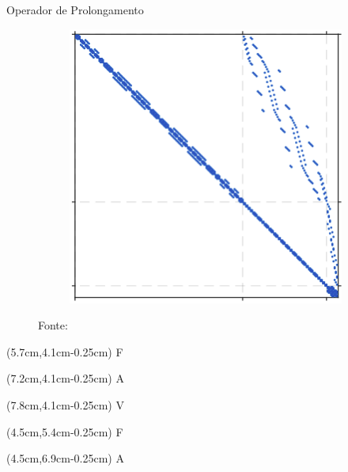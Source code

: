\documentclass[professionalfont]{beamer}
\begin{document}
\begin{frame}{Operador de Prolongamento}
\begin{figure}[!ht]
\begin{subfigure}{.3\textwidth}
            \subcaption{\finewirebasketMatrix}
            \label{fig:multiescala.4.b}
        \end{subfigure}
        \begin{subfigure}{.3\textwidth}
            \centering
            \includegraphics[scale=0.27]{./imgs/im12.png}
            \subcaption{$\finewirebasketMatrixMod$}
            \label{fig:multiescala.4.c}
        \end{subfigure}
        
        {\footnotesize Fonte:\cite{Magri2015}}
        \label{fig:multiescala.4}
    \end{figure}

    \newcommand{\deltaimg}{3.8cm}
    \newcommand{\deltaimgg}{3.65cm}
    \newcommand{\deltaimggg}{0.25cm}

    \begin{textblock*}{5cm}(5.7cm,4.1cm-\deltaimggg)
        F
    \end{textblock*}

    \begin{textblock*}{5cm}(7.2cm,4.1cm-\deltaimggg)
        A
    \end{textblock*}

    \begin{textblock*}{5cm}(7.8cm,4.1cm-\deltaimggg)
        V
    \end{textblock*}

    \begin{textblock*}{5cm}(4.5cm,5.4cm-\deltaimggg)
        F
    \end{textblock*}

    \begin{textblock*}{5cm}(4.5cm,6.9cm-\deltaimggg)
        A
    \end{textblock*}


\end{frame}
\end{document}
